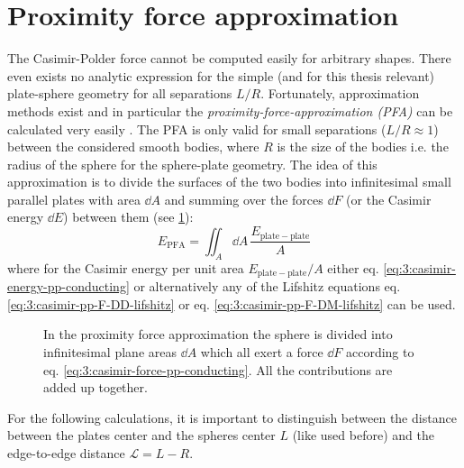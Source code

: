 \section{Proximity force approximation}\label{sec:3:pfa}

The Casimir-Polder force cannot be computed easily for arbitrary shapes. There even exists no analytic expression for the simple (and for this thesis relevant) plate-sphere geometry for all separations $L/R$.
Fortunately, approximation methods exist and in particular the \emph{proximity-force-approximation (PFA)} can be calculated very easily \cite{Hartmann_2018,Emig_2007a,Bulgac_2006}.
The PFA is only valid for small separations ($L/R \approx 1$) between the considered smooth bodies, where $R$ is the size of the bodies i.e. the radius of the sphere for the sphere-plate geometry.
The idea of this approximation is to divide the surfaces of the two bodies into infinitesimal small parallel plates with area $\dd A$ and summing over the forces $\dd F$ (or the Casimir energy $\dd E$) between them (see \cref{fig:3:PFA}):
\begin{equation}\label{eq:3:pfa}
  E_\mathrm{PFA} = \iint_A \dd A \, \frac{E_\mathrm{plate-plate}}{A}
\end{equation}
where for the Casimir energy per unit area $E_\mathrm{plate-plate}/A$ either eq. \eqref{eq:3:casimir-energy-pp-conducting} or alternatively any of the Lifshitz equations eq. \eqref{eq:3:casimir-pp-F-DD-lifshitz} or eq. \eqref{eq:3:casimir-pp-F-DM-lifshitz} can be used.
\begin{figure}[!htbp]
  \centering
  \def\svgwidth{0.55\textwidth}
  
  \caption{In the proximity force approximation the sphere is divided into infinitesimal plane areas $\dd A$ which all exert a force $\dd F$ according to eq. \eqref{eq:3:casimir-force-pp-conducting}. All the contributions are added up together.}
  \label{fig:3:PFA}
\end{figure}
For the following calculations, it is important to distinguish between the distance between the plates center and the spheres center $L$ (like used before) and the edge-to-edge distance $\mathscr{L} = L - R$.

